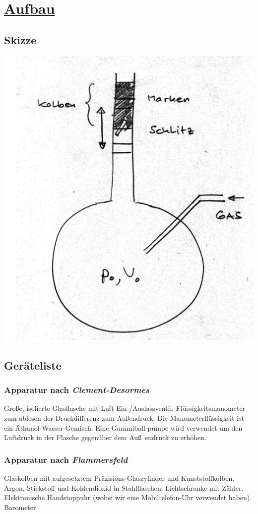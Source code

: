 \documentclass[11pt,a4paper]{article}
\begin{document}
  \section{\underline{Aufbau}}
  \subsection{Skizze}
  \includegraphics{skizzeIsentropenindex.png}
  \subsection{Ger\"ateliste}
  \subsubsection{Apparatur nach \itshape{Clement-Desormes}\/}
  Gro{\ss}e, isolierte Glasflasche mit Luft Ein-/Auslassventil,
  Fl\"ussigkeitsmanometer zum ablesen der Druckdifferenz zum Au{\ss}endruck. Die 
  Manometerfl\"ussigkeit ist ein \"Athanol-Wasser-Gemisch. Eine Gummiball-pumpe
  wird verwendet um den Luftdruck in der Flasche gegen\"uber dem Au\ss~endruck zu 
  erh\"ohen.
  \subsubsection{Apparatur nach \itshape{Flammersfeld}\/}
  Glaskolben mit aufgesetztem Pr\"azisions-Glaszylinder und Kunststoffkolben. Argon, 
  Stickstoff und Kohlendioxid in Stahlflaschen. Lichtschranke mit Z\"ahler. Elektronische
  Handstoppuhr (wobei wir eine Mobiltelefon-Uhr verwendet haben). Barometer.
  \newpage
\end{document}
